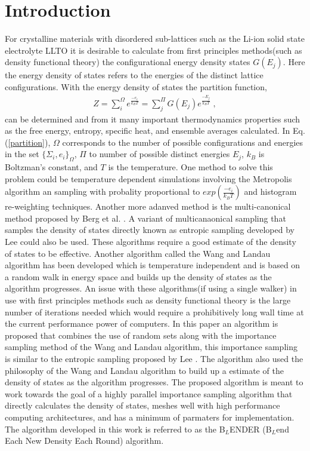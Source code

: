 \documentclass[aps,prl,reprint,superscriptaddress,showkeys]{revtex4-1}
\begin{document}
\section{Introduction}
For crystalline  materials  with disordered sub-lattices such as the Li-ion solid state electrolyte LLTO it is desirable to calculate from first principles methods(such as density functional theory\cite{kohn:1965}) the configurational  energy density states $G(E_j)$. Here the energy density of states refers to the energies of the distinct lattice configurations. With the energy density of states the partition function,
\begin{equation}
\begin{split}
Z = \sum_{i}^{\Omega}e^{\frac{-e_i}{k_B T} }= \sum_{j}^{\Pi}G(E_j)e^{\frac{-E_j}{k_BT}} \;,
\end{split}
\label{partition}
\end{equation}
can be  determined and from it many important thermodynamics properties such as the free energy, entropy, specific heat, and ensemble averages calculated. In Eq. (\ref{partition}), $\Omega$ corresponds to the number of possible configurations and energies in the set $\{\Sigma_i,e_i\}_\Omega$, $\Pi$ to number of possible distinct energies $E_j$, $k_B$ is Boltzman's constant, and $T$ is 
the temperature. One method to solve this problem could be temperature dependent simulations involving the  Metropolis algorithm an sampling with probality proportional  to $exp(\frac{-e_i}{k_B T})$ 
and histogram re-weighting techniques\cite{metropolis_equation_1953, landau_MC_simulations}. Another more adanved method is the multi-canonical method proposed by Berg et al. \cite{Multi_Canonical}. A variant of multicanaonical sampling that samples the density of states directly known as entropic sampling developed by Lee \cite{Entropic_Sampling} could also be used. 
These algorithms require a good estimate of the density of states to be effective.  Another algorithm called the  Wang and Landau algorithm \cite{WL_phys_rev_lett} has been developed which is temperature independent and is based on a random walk in energy space and builds up the density of states as the algorithm progresses.  An issue with these algorithms(if using a single walker) in use with first principles methods such as density functional theory is the large number of iterations needed which would require a prohibitively long wall time at the current performance power of computers.  In this paper an algorithm is proposed that combines the use of random sets along with the importance sampling method of the Wang and Landau algorithm, this importance sampling is similar to the entropic sampling proposed by Lee \cite{Entropic_Sampling}. The algorithm also used the philosophy of the Wang and Landau algorithm to build up a estimate of the density of states as the algorithm progresses.  The proposed algorithm is meant to work towards the goal of a highly parallel importance sampling algorithm that directly calculates the density of states, meshes well with high performance computing architectures, and has a minimum of parmaters for implementation. The algorithm developed in this work is referred to as the B$_{L}$ENDER (B$_{L}$end Each New Density Each Round) algorithm. 
\end{document}
